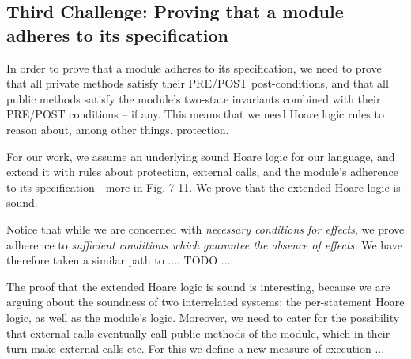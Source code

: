  
 \subsection{Third Challenge: Proving that a module adheres to its specification}
 \label{sec:howThird}
 
{In order to prove that a module adheres to its specification, we need to prove that all  private methods satisfy their  PRE/POST post-conditions, and that all public methods satisfy the module's two-state invariants combined with their PRE/POST conditions -- if any.
This means that we need Hoare logic rules to reason about, among other things, protection.}

{For our work, we assume an underlying sound Hoare logic for {our} language, and extend it with rules about protection, external calls, and the module's adherence to its 
specification - more in Fig. 7-11.
We prove that the extended Hoare logic is sound.
}

{Notice that while we are concerned with \emph{necessary conditions for effects}, we prove adherence to \emph{sufficient conditions which guarantee the absence of effects.}
We have therefore taken a similar path to .... TODO ...
}

 {The proof that the extended Hoare logic is sound is interesting, because we are arguing about the soundness of two interrelated systems: 
 the per-statement  Hoare logic, as well as the module's logic.
Moreover, we need to cater for the possibility that external calls eventually call public methods of the module, which in their turn make external calls etc.
For this we define a new measure of execution ...}


 
%

